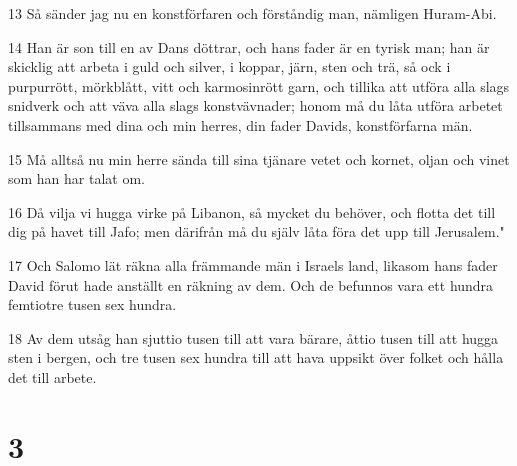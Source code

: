\par 13 Så sänder jag nu en konstförfaren och förståndig man, nämligen Huram-Abi.
\par 14 Han är son till en av Dans döttrar, och hans fader är en tyrisk man; han är skicklig att arbeta i guld och silver, i koppar, järn, sten och trä, så ock i purpurrött, mörkblått, vitt och karmosinrött garn, och tillika att utföra alla slags snidverk och att väva alla slags konstvävnader; honom må du låta utföra arbetet tillsammans med dina och min herres, din fader Davids, konstförfarna män.
\par 15 Må alltså nu min herre sända till sina tjänare vetet och kornet, oljan och vinet som han har talat om.
\par 16 Då vilja vi hugga virke på Libanon, så mycket du behöver, och flotta det till dig på havet till Jafo; men därifrån må du själv låta föra det upp till Jerusalem."
\par 17 Och Salomo lät räkna alla främmande män i Israels land, likasom hans fader David förut hade anställt en räkning av dem. Och de befunnos vara ett hundra femtiotre tusen sex hundra.
\par 18 Av dem utsåg han sjuttio tusen till att vara bärare, åttio tusen till att hugga sten i bergen, och tre tusen sex hundra till att hava uppsikt över folket och hålla det till arbete.

\chapter{3}

